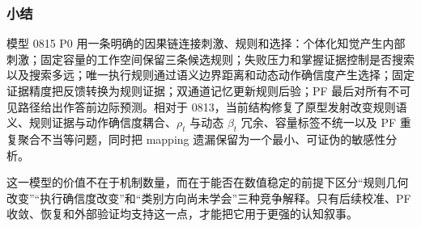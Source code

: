 \subsubsection{小结}

模型 0815 P0 用一条明确的因果链连接刺激、规则和选择：个体化知觉产生内部刺激；固定容量的工作空间保留三条候选规则；失败压力和掌握证据控制是否搜索以及搜索多远；唯一执行规则通过语义边界距离和动态动作确信度产生选择；固定证据精度把反馈转换为规则证据；双通道记忆更新规则后验；PF 最后对所有不可见路径给出作答前边际预测。相对于 0813，当前结构修复了原型发射改变规则语义、规则证据与动作确信度耦合、$\rho_t$ 与动态 $\beta_t$ 冗余、容量标签不统一以及 PF 重复聚合不当等问题，同时把 mapping 遗漏保留为一个最小、可证伪的敏感性分析。

这一模型的价值不在于机制数量，而在于能否在数值稳定的前提下区分“规则几何改变”“执行确信度改变”和“类别方向尚未学会”三种竞争解释。只有后续校准、PF 收敛、恢复和外部验证均支持这一点，才能把它用于更强的认知叙事。

